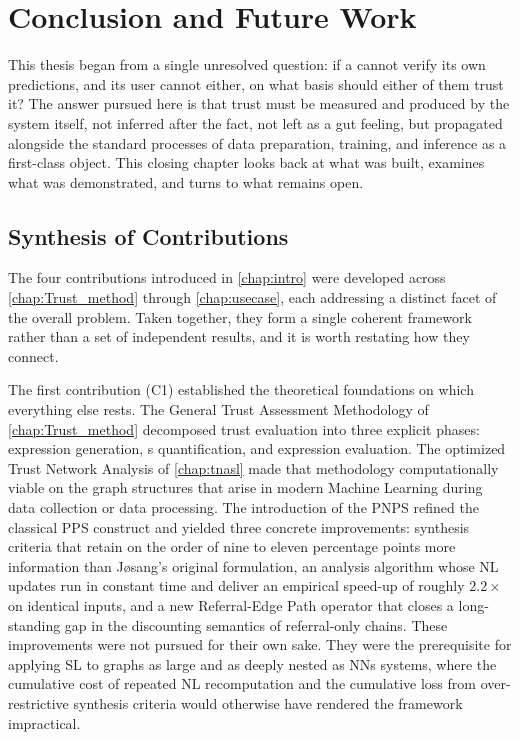 
\chapter{Conclusion and Future Work}
\label{chap:conclusion}
This thesis began from a single unresolved question: if a  cannot verify its own predictions, and its user cannot either, on what basis should either of them trust it? The answer pursued here is that trust must be measured and produced by the system itself, not inferred after the fact, not left as a gut feeling, but propagated alongside the standard processes of data preparation, training, and inference as a first-class object. This closing chapter looks back at what was built, examines what was demonstrated, and turns to what remains open.



\section{Synthesis of Contributions}
\label{sec:conclusion-synthesis}

The four contributions introduced in \cref{chap:intro} were developed across \cref{chap:Trust_method} through \cref{chap:usecase}, each addressing a distinct facet of the overall problem. Taken together, they form a single coherent framework rather than a set of independent results, and it is worth restating how they connect.

The first contribution (C1) established the theoretical foundations on which everything else rests. The General Trust Assessment Methodology of \cref{chap:Trust_method} decomposed trust evaluation into three explicit phases: expression generation, s quantification, and expression evaluation. The optimized Trust Network Analysis of \cref{chap:tnasl} made that methodology computationally viable on the graph structures that arise in modern Machine Learning during data collection or data processing. The introduction of the \acf{PNPS} refined the classical \acf{PPS} construct and yielded three concrete improvements: synthesis criteria that retain on the order of nine to eleven percentage points more information than Jøsang's original formulation, an analysis algorithm whose \acf{NL} updates run in constant time and deliver an empirical speed-up of roughly $2.2\times$ on identical inputs, and a new Referral-Edge Path operator that closes a long-standing gap in the discounting semantics of referral-only chains. These improvements were not pursued for their own sake. They were the prerequisite for applying \ac{SL} to graphs as large and as deeply nested as \acp{NN} systems, where the cumulative cost of repeated \ac{NL} recomputation and the cumulative loss from over-restrictive synthesis criteria would otherwise have rendered the framework impractical.

